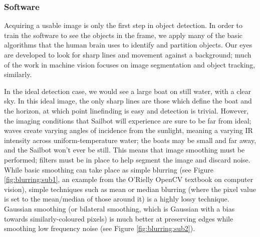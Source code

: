 \subsubsection{\label{sec:discussion:theory:detectionsoftware}Software}
Acquiring a usable image is only the first step in object detection. In order to train the software to see the objects in the frame, we apply many of the basic algorithms that the human brain uses to identify and partition objects. Our eyes are developed to look for sharp lines and movement against a background; much of the work in machine vision focuses on image segmentation and object tracking, similarly. 

In the ideal detection case, we would see a large boat on still water, with a clear sky. In this ideal image, the only sharp lines are those which define the boat and the horizon, at which point linefinding is easy and detection is trivial. However, the imaging conditions that Sailbot will experience are sure to be far from ideal; waves create varying angles of incidence from the sunlight, meaning a varying IR intensity across uniform-temperature water; the boats may be small and far away, and the Sailbot won't ever be still. This means that image smoothing must be performed; filters must be in place to help segment the image and discard noise. While basic smoothing can take place as simple blurring (see Figure \ref{fig:blurring:sub1}, an example from the O'Rielly OpenCV textbook on computer vision), simple techniques such as mean or median blurring (where the pixel value is set to the mean/median of those around it) is a highly lossy technique. Gaussian smoothing (or bilateral smoothing, which is Gaussian with a bias towards similarly-coloured pixels) is much better at preserving edges while smoothing low frequency noise (see Figure \ref{fig:blurring:sub2}).

